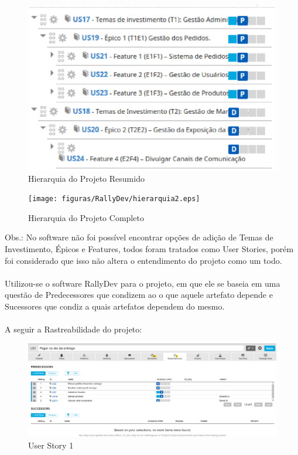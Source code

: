 \begin{figure}[h]
    \centering
    \label{fig01}
        \includegraphics[keepaspectratio=true,scale=0.5]{figuras/RallyDev/hierarquia1.eps}
    \caption{Hierarquia do Projeto Resumido}
\end{figure}

\begin{figure}[h]
    \centering
    \label{fig01}
        \texttt{[image: figuras/RallyDev/hierarquia2.eps]}
    \caption{Hierarquia do Projeto Completo}
\end{figure}

Obs.: No software não foi possível encontrar opções de adição de Temas de Investimento, Épicos e Features, todos foram tratados como User Stories, porém foi considerado que isso não altera o entendimento do projeto como um todo.\\
\\
\tab Utilizou-se o software RallyDev para o projeto, em que ele se baseia em uma questão de Predecessores que condizem ao o que aquele artefato depende e Sucessores que condiz a quais artefatos dependem do mesmo.\\ \\
\tab A seguir a Rastreabilidade do projeto:\\

\begin{figure}[h]
    \centering
    \label{fig01}
        \includegraphics[keepaspectratio=true,scale=0.3]{figuras/RallyDev/US1.eps}
    \caption{User Story 1}
\end{figure}

